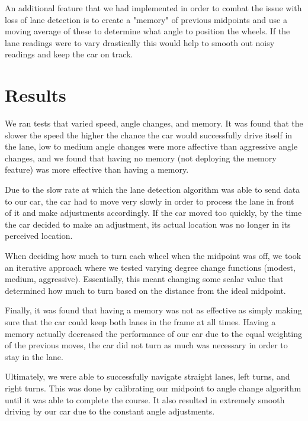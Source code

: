 \documentclass{article}
\begin{document}
An additional feature that we had implemented in order to combat the issue
with loss of lane detection is to create a "memory" of previous midpoints and
use a moving average of these to determine what angle to position the wheels. If
the lane readings were to vary drastically this would help to smooth out noisy
readings and keep the car on track.

\section{Results}
\vspace{-.3cm}
We ran tests that varied speed, angle changes, and memory. It was found that the
slower the speed the higher the chance the car would successfully drive itself in
the lane, low to medium angle changes were more affective than aggressive angle changes,
and we found that having no memory (not deploying the memory feature) was more
effective than having a memory.

Due to the slow rate at which the lane detection algorithm was able to send data to
our car, the car had to move very slowly in order to process the lane in front of it
and make adjustments accordingly. If the car moved too quickly, by the time the car
decided to make an adjustment, its actual location was no longer in its perceived location.

When deciding how much to turn each wheel when the midpoint was off, we took an iterative
approach where we tested varying degree change functions (modest, medium, aggressive).
Essentially, this meant changing some scalar value that determined how much to turn
based on the distance from the ideal midpoint.

Finally, it was found that having a memory was not as effective as simply making sure
that the car could keep both lanes in the frame at all times. Having a memory actually
decreased the performance of our car due to the equal weighting of the previous moves,
the car did not turn as much was necessary in order to stay in the lane.

Ultimately, we were able to successfully navigate straight lanes, left turns, and right
turns. This was done by calibrating our midpoint to angle change algorithm until it was
able to complete the course. It also resulted in extremely smooth driving by our car due to
the constant angle adjustments.
\end{document}
